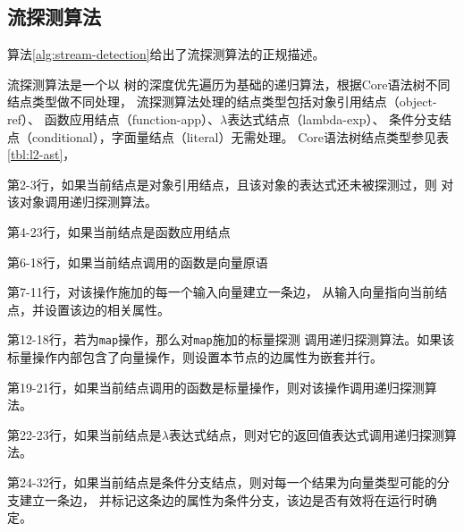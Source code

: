 \subsection{流探测算法}\label{subsec:stream-detection-algorithm}
算法\ref{alg:stream-detection}给出了流探测算法的正规描述。

流探测算法是一个以
树的深度优先遍历为基础的递归算法，根据Core语法树不同结点类型做不同处理，
流探测算法处理的结点类型包括对象引用结点（object-ref）、
函数应用结点（function-app）、$\lambda$表达式结点（lambda-exp）、
条件分支结点（conditional），字面量结点（literal）无需处理。
Core语法树结点类型参见表\ref{tbl:l2-ast}，
\begin{compactitem}
  \item 第2-3行，如果当前结点是对象引用结点，且该对象的表达式还未被探测过，则
    对该对象调用递归探测算法。
  \item 第4-23行，如果当前结点是函数应用结点
    \begin{compactitem}
      \item 第6-18行，如果当前结点调用的函数是向量原语
        \begin{compactitem}
          \item 第7-11行，对该操作施加的每一个输入向量建立一条边，
            从输入向量指向当前结点，并设置该边的相关属性。
          \item 第12-18行，若为\texttt{map}操作，那么对\texttt{map}施加的标量探测
            调用递归探测算法。如果该标量操作内部包含了向量操作，则设置本节点的边属性为嵌套并行。
        \end{compactitem}
      \item 第19-21行，如果当前结点调用的函数是标量操作，则对该操作调用递归探测算法。
    \end{compactitem}
  \item 第22-23行，如果当前结点是$\lambda$表达式结点，则对它的返回值表达式调用递归探测算法。
  \item 第24-32行，如果当前结点是条件分支结点，则对每一个结果为向量类型可能的分支建立一条边，
    并标记这条边的属性为条件分支，该边是否有效将在运行时确定。
\end{compactitem}
